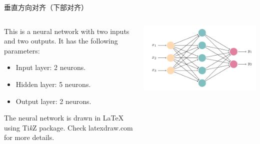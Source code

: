\documentclass{ctexbeamer}
\begin{document}
\begin{frame}{垂直方向对齐（下部对齐）}
  \begin{columns}[b]
  \begin{column}{0.5\textwidth}
    This is a neural network with two inputs and two outputs. It has the following parameters:
    \begin{itemize}
      \item Input layer: 2 neurons.
      \item Hidden layer: 5 neurons.
      \item Output layer: 2 neurons.
    \end{itemize}
    The neural network is drawn in \LaTeX{} using Ti\textit{k}Z package. Check latexdraw.com for more details.
  \end{column}
  \begin{column}{0.5\textwidth}
    \includegraphics[width=\textwidth]{neural-networks.pdf}
  \end{column}
  \end{columns}
\end{frame}
\end{document}
